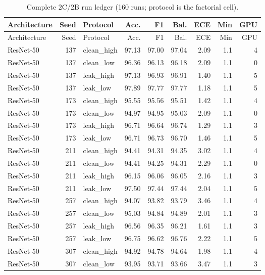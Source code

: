 {\scriptsize
\setlength{\tabcolsep}{3.5pt}
\begin{longtable}{lrlrrrrrr}
\caption{Complete 2C/2B run ledger (160 runs; protocol is the factorial cell).}\label{r:tab:ledger-factorial}\\
\toprule
Architecture & Seed & Protocol & Acc. & F1 & Bal. & ECE & Min & GPU \\
\midrule
\endfirsthead
\toprule
Architecture & Seed & Protocol & Acc. & F1 & Bal. & ECE & Min & GPU \\
\midrule
\endhead
\bottomrule
\endfoot
ResNet-50 & 137 & clean\_high & 97.13 & 97.00 & 97.04 & 2.09 & 1.1 & 4 \\
ResNet-50 & 137 & clean\_low & 96.36 & 96.13 & 96.18 & 2.09 & 1.1 & 0 \\
ResNet-50 & 137 & leak\_high & 97.13 & 96.93 & 96.91 & 1.40 & 1.1 & 5 \\
ResNet-50 & 137 & leak\_low & 97.89 & 97.77 & 97.77 & 1.18 & 1.1 & 5 \\
ResNet-50 & 173 & clean\_high & 95.55 & 95.56 & 95.51 & 1.42 & 1.1 & 4 \\
ResNet-50 & 173 & clean\_low & 94.97 & 94.95 & 95.03 & 2.09 & 1.1 & 0 \\
ResNet-50 & 173 & leak\_high & 96.71 & 96.64 & 96.74 & 1.29 & 1.1 & 3 \\
ResNet-50 & 173 & leak\_low & 96.71 & 96.73 & 96.70 & 1.46 & 1.1 & 5 \\
ResNet-50 & 211 & clean\_high & 94.41 & 94.31 & 94.35 & 3.02 & 1.1 & 4 \\
ResNet-50 & 211 & clean\_low & 94.41 & 94.25 & 94.31 & 2.29 & 1.1 & 0 \\
ResNet-50 & 211 & leak\_high & 96.15 & 96.06 & 96.05 & 2.16 & 1.1 & 3 \\
ResNet-50 & 211 & leak\_low & 97.50 & 97.44 & 97.44 & 2.04 & 1.1 & 5 \\
ResNet-50 & 257 & clean\_high & 94.07 & 93.82 & 93.79 & 3.46 & 1.1 & 4 \\
ResNet-50 & 257 & clean\_low & 95.03 & 94.84 & 94.89 & 2.01 & 1.1 & 3 \\
ResNet-50 & 257 & leak\_high & 96.56 & 96.35 & 96.21 & 1.61 & 1.1 & 3 \\
ResNet-50 & 257 & leak\_low & 96.75 & 96.62 & 96.76 & 2.22 & 1.1 & 5 \\
ResNet-50 & 307 & clean\_high & 94.92 & 94.78 & 94.64 & 1.98 & 1.1 & 4 \\
ResNet-50 & 307 & clean\_low & 93.95 & 93.71 & 93.66 & 3.47 & 1.1 & 3 \\

\end{longtable}}
